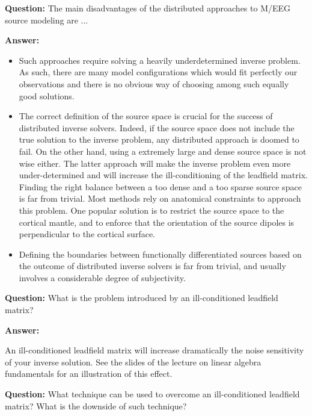 \documentclass[a4paper,10pt,oneside]{article}
\begin{document}
\vspace{1cm}

\noindent \textbf{Question:} The main disadvantages of the distributed approaches to M/EEG source modeling are ...

\noindent \textbf{Answer:}

\begin{itemize}

\item Such approaches require solving a heavily underdetermined inverse problem. As such, there are many model configurations which would fit perfectly our observations and there is no obvious way of choosing among such equally good solutions.

\item The correct definition of the source space is crucial for the success of distributed inverse solvers. Indeed, if the source space does not include the true solution to the inverse problem, any distributed approach is doomed to fail. On the other hand, using a extremely large and dense source space is not wise either. The latter approach will make the inverse problem even more under-determined and will increase the ill-conditioning of the leadfield matrix. Finding the right balance between a too dense and a too sparse source space is far from trivial. Most methods rely on anatomical constraints to approach this problem. One popular solution is to restrict the source space to the cortical mantle, and to enforce that the orientation of the source dipoles is perpendicular to the cortical surface.

\item Defining the boundaries between functionally differentiated sources based on the outcome of distributed inverse solvers is far from trivial, and usually involves a considerable degree of subjectivity.

\end{itemize}


\noindent \textbf{Question:} What is the problem introduced by an ill-conditioned leadfield matrix?

\noindent \textbf{Answer:}

An ill-conditioned leadfield matrix will increase dramatically the noise sensitivity of your inverse solution. See the slides of the lecture on linear algebra fundamentals for an illustration of this effect. 

\noindent \textbf{Question:} What technique can be used to overcome an ill-conditioned leadfield matrix? What is the downside of such technique?
\end{document}
